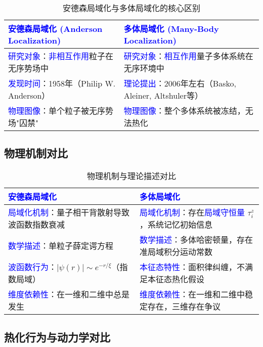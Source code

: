 \documentclass[11pt,a4paper]{article}
\begin{document}
\begin{table}[H]
\centering
\caption{安德森局域化与多体局域化的核心区别}
\begin{tabular}{|p{}|p{}|}
\hline
\textcolor{blue}{安德森局域化 (Anderson Localization)} & \textcolor{blue}{多体局域化 (Many-Body Localization)} \\
\hline
\hline
\textcolor{blue}{研究对象}：\textcolor{blue}{非相互作用}粒子在无序势场中 & \textcolor{blue}{研究对象}：\textcolor{blue}{相互作用}量子多体系统在无序环境中 \\
\hline
\textcolor{blue}{发现时间}：1958年（Philip W. Anderson） & \textcolor{blue}{理论提出}：2006年左右（Basko, Aleiner, Altshuler等） \\
\hline
\textcolor{blue}{物理图像}：单个粒子被无序势场"囚禁" & \textcolor{blue}{物理图像}：整个多体系统被冻结，无法热化 \\
\hline
\end{tabular}
\end{table}

\subsection{物理机制对比}

\begin{table}[H]
\centering
\caption{物理机制与理论描述对比}
\begin{tabular}{|p{}|p{}|}
\hline
\textcolor{blue}{安德森局域化} & \textcolor{blue}{多体局域化} \\
\hline
\hline
\textcolor{blue}{局域化机制}：量子相干背散射导致波函数指数衰减 & \textcolor{blue}{局域化机制}：存在\textcolor{blue}{局域守恒量} $\tau_i^z$，系统记忆初始信息 \\
\hline
\textcolor{blue}{数学描述}：单粒子薛定谔方程 & \textcolor{blue}{数学描述}：多体哈密顿量，存在准局域积分运动常数 \\
\hline
\textcolor{blue}{波函数行为}：$|\psi(r)| \sim e^{-r/\xi}$（指数局域） & \textcolor{blue}{本征态特性}：面积律纠缠，不满足本征态热化假设 \\
\hline
\textcolor{blue}{维度依赖性}：在一维和二维中总是发生 & \textcolor{blue}{维度依赖性}：在一维和二维中稳定存在，三维存在争议 \\
\hline
\end{tabular}
\end{table}

\subsection{热化行为与动力学对比}
\end{document}
